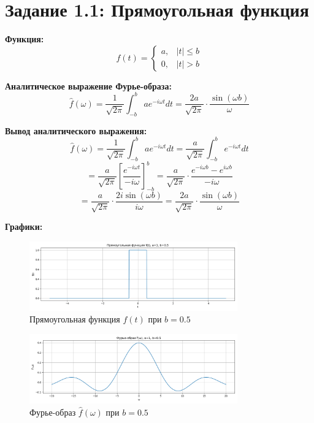 \section*{Задание 1.1: Прямоугольная функция}

\textbf{Функция:}
\[
f(t) = 
\begin{cases}
a, & |t| \le b \\
0, & |t| > b
\end{cases}
\]

\textbf{Аналитическое выражение Фурье-образа:}
\[
\hat{f}(\omega) = \frac{1}{\sqrt{2\pi}} \int_{-b}^{b} a e^{-i \omega t} dt = \frac{2a}{\sqrt{2\pi}} \cdot \frac{\sin(\omega b)}{\omega}
\]

\textbf{Вывод аналитического выражения:}
\[
\hat{f}(\omega) = \frac{1}{\sqrt{2\pi}} \int_{-b}^{b} a e^{-i \omega t} dt = \frac{a}{\sqrt{2\pi}} \int_{-b}^{b} e^{-i \omega t} dt
\]
\[
= \frac{a}{\sqrt{2\pi}} \left[ \frac{e^{-i \omega t}}{-i \omega} \right]_{-b}^{b} = \frac{a}{\sqrt{2\pi}} \cdot \frac{e^{-i \omega b} - e^{i \omega b}}{-i \omega}
\]
\[
= \frac{a}{\sqrt{2\pi}} \cdot \frac{2i \sin(\omega b)}{i \omega} = \frac{2a}{\sqrt{2\pi}} \cdot \frac{\sin(\omega b)}{\omega}
\]

\textbf{Графики:}

\begin{figure}[H]
    \centering
    \includegraphics[width=0.8\textwidth]{python/rect_function_b0.5.png}
    \caption{Прямоугольная функция $f(t)$ при $b = 0.5$}
\end{figure}

\begin{figure}[H]
    \centering
    \includegraphics[width=0.8\textwidth]{python/rect_fourier_b0.5.png}
    \caption{Фурье-образ $\hat{f}(\omega)$ при $b = 0.5$}
\end{figure}

